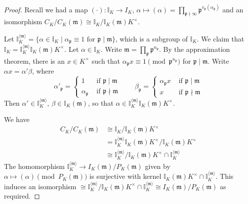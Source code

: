 \documentclass[11pt]{article}
\theoremstyle{definition}
\theoremstyle{plain}
\theoremstyle{remark}
\newcommand{\II}{\mathbb{I}}
\newcommand{\fp}{\mathfrak{p}}
\newcommand{\fm}{\mathfrak{m}}
\begin{document}
\begin{proof}
    Recall we had a map $(\cdot) : \II_K \to I_K$, $\alpha \mapsto (\alpha) = \prod_{\fp \nmid \infty} \fp^{v_\fp(\alpha_\fp)}$ and an isomorphism $C_K/C_K(\fm) \cong \II_K / \II_K(\fm)K^\times$.

    Let $\II_K^{\langle \fm \rangle} = \{\alpha \in \II_K \mid \alpha_\fp \equiv 1 \text{ for } \fp \mid \fm\}$, which is a subgroup of $\II_K$. We claim that $\II_K = \II_K^{\langle \fm \rangle} \II_K(\fm) K^\times$. Let $\alpha \in \II_K$. Write $\fm = \prod_{\fp} \fp^{n_\fp}$. By the approximation theorem, there is an $x \in K^\times$ such that $\alpha_\fp x \equiv 1 \pmod{\fp^{n_\fp}}$ for $\fp \mid \fm$. Write $\alpha x = \alpha' \beta$, where
    \begin{equation*}
        \alpha'_\fp = \begin{cases}
            1 & \text{ if } \fp \mid \fm\\
            \alpha_\fp & \text{ if } \fp \nmid \fm
        \end{cases}
        \qquad
        \beta_\fp = \begin{cases}
            \alpha_\fp x & \text{ if } \fp \mid \fm\\
            x & \text{ if } \fp \nmid \fm
        \end{cases}
    \end{equation*}
    Then $\alpha' \in \II_K^{\langle \fm \rangle}$, $\beta \in \II_K(\fm)$, so that $\alpha \in \II_K^{\langle \fm \rangle} \II_K(\fm) K^\times$.

    We have
    \begin{align*}
        C_K / C_K(\fm)
        &\cong \II_K / \II_K(\fm) K^\times\\
        &= \II_K^{\langle \fm \rangle} \II_K(\fm) K^\times / \II_K(\fm) K^\times\\
        &\cong \II_K^{\langle \fm \rangle} / \II_K(\fm) K^\times \cap \II_K^{\langle \fm \rangle}
    \end{align*}
    The homomorphism $\II_K^{\langle \fm \rangle} \to I_K(\fm)/P_K(\fm)$ given by $\alpha \mapsto (\alpha) \pmod{P_K(\fm)}$  is surjective with kernel $\II_K(\fm) K^\times \cap \II_K^{\langle \fm \rangle}$. This induces an isomorphism $\cong \II_K^{\langle \fm \rangle} / \II_K(\fm) K^\times \cap \II_K^{\langle \fm \rangle} \cong I_K(\fm)/P_K(\fm)$ as required. %
\end{proof}
\end{document}
